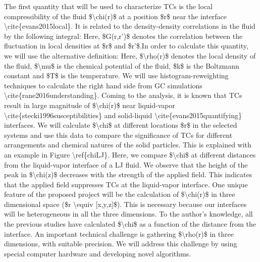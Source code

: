 \par The first quantity that will be used to characterize TCs is the local compressibility of the fluid \$\textbackslash chi(r)\$ at a position \$r\$ near the interface \textbackslash cite\{evans2015local\}. It is related to the density-density correlations in the fluid by the following integral: Here, \$G(r,r')\$ denotes the correlation between the fluctuation in local densities at \$r\$ and \$r'\$.In order to calculate this quantity, we will use the alternative definition: Here, \$\textbackslash rho(r)\$ denotes the local density of the fluid, \$\textbackslash mu\$ is the chemical potential of the fluid, \$k\$ is the Boltzmann constant and \$T\$ is the temperature. We will use histogram-reweighting techniques to calculate the right hand side from GC simulations \textbackslash cite\{rane2016understanding\}. Coming to the analysis, it is known that TCs result in large magnitude of \$\textbackslash chi(r)\$ near liquid-vapor \textbackslash cite\{stecki1996susceptibilities\} and solid-liquid \textbackslash cite\{evans2015quantifying\} interfaces. We will calculate \$\textbackslash chi\$ at different locations \$r\$ in the selected systems and use this data to compare the significance of TCs for different arrangements and chemical natures of the solid particles. This is explained with an example in Figure \textbackslash ref\{chiLJ\}. Here, we compare \$\textbackslash chi\$ at different distances from the liquid-vapor interface of a LJ fluid. We observe that the height of the peak in \$\textbackslash chi(z)\$ decreases with the strength of the applied field. This indicates that the applied field suppresses TCs at the liquid-vapor interface. One unique feature of the proposed project will be the calculation of \$\textbackslash chi(r)\$ in three dimensional space (\$r \textbackslash equiv [x,y,z]\$). This is necessary because our interfaces will be heterogeneous in all the three dimensions. To the author's knowledge, all the previous studies have calculated \$\textbackslash chi\$ as a function of the distance from the interface. An important technical challenge is gathering \$\textbackslash rho(r)\$ in three dimensions, with suitable precision. We will address this challenge by using special computer hardware and developing novel algorithms.
